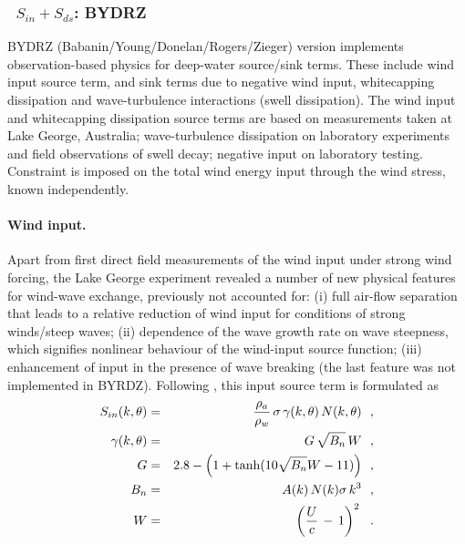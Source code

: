 \vsssub
\subsubsection{~$S_{in} + S_{ds}$: BYDRZ} \label{sec:ST6}
\vsssub


\noindent
BYDRZ (Babanin/Young/Donelan/Rogers/Zieger) version implements\linebreak
observation-based physics for deep-water source/sink terms. These include wind input
source term, and sink terms due to negative wind input, whitecapping
dissipation and wave-turbulence interactions (swell dissipation).
The wind input and whitecapping dissipation source terms are based on
measurements taken at Lake George, Australia; wave-turbulence dissipation
on laboratory experiments and field observations of swell decay; negative
input on laboratory testing. Constraint is imposed on the total wind
energy input through the wind stress, known independently.

\paragraph{Wind input.} Apart from first direct field measurements
of the wind input under strong wind forcing,  the Lake George experiment
revealed a number of new physical features for wind-wave exchange,
previously not accounted for:
(i) full air-flow separation that leads to a relative reduction of
wind input for conditions of strong winds/steep waves;
(ii) dependence of the wave growth rate on wave steepness,
which signifies nonlinear behaviour of the wind-input source function;
(iii) enhancement of input in the presence of wave breaking
\citep{art:Dea06,art:Bea07} (the last feature was not implemented in BYRDZ).
Following \citet{art:RBW12}, this input source term is formulated as
\begin{eqnarray}
S_{in}(k,\theta) & = & \frac{\rho_a}{\rho_w}\, \sigma\,\gamma(k,\theta)\,N(k,\theta) \:\:\: ,
\label{eq:ST601} \\ \gamma(k,\theta) &=& G\,\sqrt{B_n}\,W \:\:\: ,
\label{eq:ST602} \\
G                &=& 2.8-\Bigl (1+\tanh (10\sqrt{B_n}W-11) \Bigr) \:\:\: ,
\label{eq:ST603} \\
B_n              &=& A(k)\,N(k)\sigma\,k^3 \:\:\: ,
\label{eq:ST604} \\
W                &=& \left (\frac{U}{c}\,-\,1 \right )^2 \:\:\: .
\label{eq:ST605}
\end{eqnarray}

